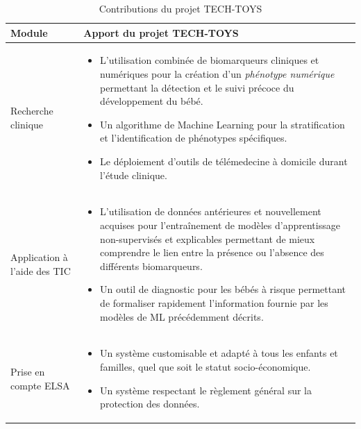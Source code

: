 \documentclass[5pt]{article}
\begin{document}
\begin{table}[H]
\begin{tabularx}{\textwidth}{|p{}|X|}
\rowcolor{lightgray}
Module & Apport du projet TECH-TOYS\\
\hline
Recherche clinique &  
                        \begin{itemize}
                        \item L’utilisation combinée de biomarqueurs cliniques et numériques pour la création d’un \textit{phénotype numérique} permettant la détection et le suivi précoce du développement du bébé.
                        \item Un algorithme de Machine Learning pour la stratification et l’identification de phénotypes spécifiques.
                        \item Le déploiement d’outils de télémedecine à domicile durant l’étude clinique.
                      \end{itemize}
                     \\
\hline

Application à l'aide des TIC &  \begin{itemize}
                        \item L’utilisation de données antérieures et nouvellement acquises pour l’entraînement de modèles d’apprentissage non-supervisés et explicables permettant de mieux comprendre le lien entre la présence ou l’absence des différents biomarqueurs.
                        \item Un outil de diagnostic pour les bébés à risque permettant de formaliser rapidement l’information fournie par les modèles de ML précédemment décrits.
                      \end{itemize}
                     \\
\hline
Prise en compte ELSA & \begin{itemize}
                        \item Un système customisable et adapté à tous les enfants et familles, quel que soit le statut socio-économique.
                        \item Un système respectant le règlement général sur la protection des données.
                      \end{itemize}\\
\hline

\end{tabularx}
\caption{Contributions du projet TECH-TOYS}
\label{}
\end{table}
\end{document}
